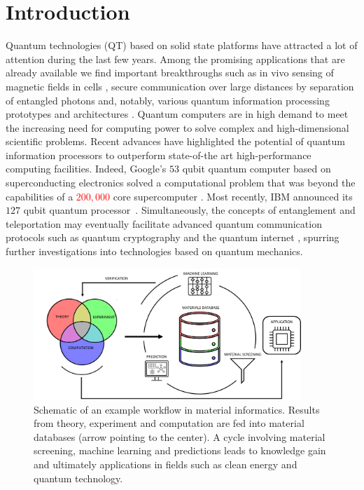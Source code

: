 \documentclass[superscriptaddress,unsortedaddress,
 amsmath,amssymb,
 aps,
]{revtex4-2}
\newcommand{\mrk}[1]{\textcolor{red}{#1}}
\begin{document}
\section*{Introduction}
Quantum technologies (QT) based on solid state platforms have attracted a lot of attention during the last few years. 
Among the promising applications that are already available we find important breakthroughs such as in vivo sensing of magnetic fields in cells \cite{Lesage_2013}, secure communication over large distances by separation of entangled photons \cite{Ursin2007} and, notably, various quantum information processing prototypes and architectures \cite{Arute_2019}.  
Quantum computers are in high demand to meet the increasing need for computing power to solve complex and high-dimensional scientific problems. 
Recent advances have highlighted the potential of quantum information processors to outperform state-of-the art high-performance computing facilities. Indeed, Google's $53$ qubit quantum computer based on superconducting electronics solved a computational problem that was beyond the capabilities of a \mrk{$200,000$} core supercomputer \cite{Arute_2019}. Most recently, IBM announced its $127$ qubit quantum processor~\cite{IBM2021}. Simultaneously, the concepts of entanglement and teleportation may eventually facilitate advanced quantum communication protocols such as quantum cryptography and the quantum internet \cite{quantum-internet-kimble}, spurring further investigations into technologies based on quantum mechanics.

\begin{figure}[t]
    \centering
    \includegraphics[width=0.9\textwidth]{figures/ht-workflow-new-2.png}
    \caption{Schematic of an example workflow in material informatics. Results from theory, experiment and computation are fed into material databases (arrow pointing to the center). A cycle involving material screening, machine learning and predictions leads to knowledge gain and ultimately applications in fields such as clean energy and quantum technology. 
    }
    \label{fig:ht-workflow}
\end{figure}
\end{document}
